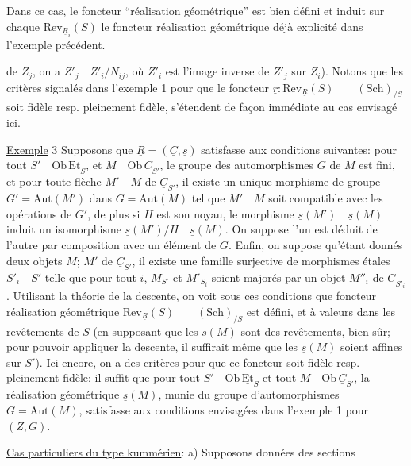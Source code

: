 Dans ce cas, le foncteur ``réalisation géométrique'' est bien défini et induit sur chaque $\mathrm{Rev}_{\underline{R}_i}(S)$ le foncteur réalisation géométrique déjà explicité dans \hspace{3em} l'exemple précédent.

de $Z_j$, on a $Z'_j\quad Z'_i/N_{ij}$, où $Z'_i$ est l'image inverse de $Z'_j$ sur $Z_i$). Notons que les critères signalés dans l'exemple 1 pour que le foncteur $\underline{r}:\mathrm{Rev}_{\underline{R}}(S)\qquad(\mathrm{Sch})_{/S}$ soit fidèle resp. pleinement fidèle, s'étendent de façon immédiate au cas envisagé ici.

\uline{Exemple} 3 Supposons que $\underline{R}=(\underline{C},\underline{s})$ satisfasse aux conditions suivantes: pour tout $S'\quad\mathrm{Ob}\,\underline{\mathrm{Et}}_S$, et $M\quad\mathrm{Ob}\,\underline{C}_{S'}$, le groupe des automorphismes $G$ de $M$ est fini, et pour toute flèche $M'\quad M$ de $\underline{C}_{S'}$, il existe un unique morphisme de groupe $G'=\mathrm{Aut}(M')$ dans $G=\mathrm{Aut}(M)$ tel que $M'\quad M$ soit compatible avec les opérations de $G'$, de plus si $H$ est son noyau, le morphisme $\underline{s}(M')\quad\underline{s}(M)$ induit un isomorphisme $\underline{s}(M')/H\quad\underline{s}(M)$.  On suppose  l'un est déduit de l'autre par composition avec un élément de $G$. Enfin, on suppose qu'étant donnés deux objets $M$; $M'$ de $\underline{C}_{S'}$, il existe une famille surjective de morphismes étales $S'_i\quad S'$ telle que pour tout $i$, $M_{S'}$ et $M'_{S_i}$ soient majorés par un objet $M''_i$ de $\underline{C}_{S'_i}$. Utilisant la théorie de la descente, on voit sous ces conditions que  foncteur réalisation géométrique  $\mathrm{Rev}_{\underline{R}}(S)\qquad(\mathrm{Sch})_{/S}$ est défini, et à valeurs dans les  revêtements de $S$ (en supposant que les $\underline{s}(M)$ sont des revêtements, bien sûr; pour pouvoir appliquer la descente, il suffirait même que les $\underline{s}(M)$ soient affines sur $S'$). Ici encore, on a des critères pour que ce foncteur soit fidèle resp. pleinement fidèle: il suffit que pour tout $S'\quad\mathrm{Ob}\,\underline{\mathrm{Et}}_S$ et tout $M\quad\mathrm{Ob}\,\underline{C}_{S'}$, la réalisation géométrique $\underline{s}(M)$, munie du groupe d'automorphismes $G=\mathrm{Aut}(M)$, satisfasse aux conditions  envisagées dans l'exemple 1 pour $(Z,G)$.

\uline{Cas particuliers du type kummérien}: a) Supposons données des sections
